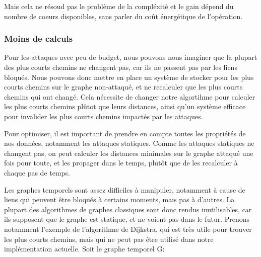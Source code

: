 Mais cela ne résoud pas le problème de la compléxité et le gain dépend du nombre de coeurs disponibles, sans parler du coût énergétique de l'opération.

\subsubsection{Moins de calculs}\label{subsubsec:moins_de_calculs}

\label{subsubsubsec:cache}
Pour les attaques avec peu de budget, nous pouvons nous imaginer que la plupart des plus courts chemins ne changent pas, car ils ne passent pas par les liens bloqués.
Nous pouvons donc mettre en place un système de stocker pour les plus courts chemins sur le graphe non-attaqué, et ne recalculer que les plus courts chemins qui ont changé.
Cela nécessite de changer notre algortihme pour calculer les plus courts chemins plûtot que leurs distances, ainsi qu'un système efficace pour invalider les plus courts chemins impactés par les attaques.

\label{subsubsubsec:proprietes_attaques_statiques}
Pour optimiser, il est important de prendre en compte toutes les propriétés de nos données, notamment les attaques statiques.
Comme les attaques statiques ne changent pas, on peut calculer les distances minimales sur le graphe attaqué une fois pour toute, et les propager dans le temps, plutôt que de les recalculer à chaque pas de temps.


\label{subsubsubsec:structure_de_donnees_opti}
Les graphes temporels sont assez difficiles à manipuler, notamment à cause de liens qui peuvent être bloqués à certains moments, mais pas à d'autres.
La plupart des algorithmes de graphes classiques sont donc rendus inutilisables, car ils supposent que le graphe est statique, et ne voient pas dans le futur.
Prenons notamment l'exemple de l'algorithme de Dijkstra, qui est très utile pour trouver les plus courts chemins, mais qui ne peut pas être utilisé dans notre implémentation actuelle.
Soit le graphe temporel G:\newline

